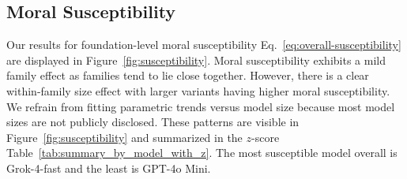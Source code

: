 \documentclass{article}
\begin{document}
\subsection{Moral Susceptibility}

Our results for foundation-level moral susceptibility Eq.~\ref{eq:overall-susceptibility} are displayed in Figure~\ref{fig:susceptibility}. Moral susceptibility exhibits a mild family effect as families tend to lie close together. However, there is a clear within-family size effect with larger variants having higher moral susceptibility. We refrain from fitting parametric trends versus model size because most model sizes are not publicly disclosed. These patterns are visible in Figure~\ref{fig:susceptibility} and summarized in the $z$-score Table~\ref{tab:summary_by_model_with_z}. The most susceptible model overall is Grok-4-fast and the least is GPT-4o Mini.
\end{document}
